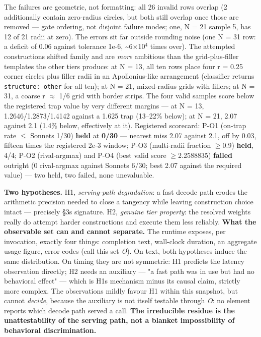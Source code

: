 The failures are geometric, not formatting: all 26 invalid rows overlap (2 additionally contain zero-radius circles, but both still overlap once those are removed --- gate ordering, not disjoint failure modes; one, N = 21 sample 5, has 12 of 21 radii at zero). The errors sit far outside rounding noise (one N = 31 row: a deficit of 0.06 against tolerance 1e-6, \textasciitilde6\(\times\)10\(^{4}\) times over). The attempted constructions shifted family and are \emph{more} ambitious than the grid-plus-filler templates the other tiers produce: at N = 13, all ten rows place four r = 0.25 corner circles plus filler radii in an Apollonius-like arrangement (classifier returns \texttt{structure:\ other} for all ten); at N = 21, mixed-radius grids with fillers; at N = 31, a coarse r \(\approx\) 1/6 grid with border strips. The four valid samples score below the registered trap value by very different margins --- at N = 13, 1.2646/1.2873/1.4142 against a 1.625 trap (13--22\% below); at N = 21, 2.07 against 2.1 (1.4\% below, effectively at it). Registered scorecard: P-O1 (on-trap rate \(\leq\) Sonnet\textquotesingle s 1/30) \textbf{held} at \textbf{0/30} --- nearest miss 2.07 against 2.1, off by 0.03, fifteen times the registered 2e-3 window; P-O3 (multi-radii fraction \(\geq\)0.9) \textbf{held}, 4/4; P-O2 (rival-argmax) and P-O4 (best valid score \(\geq\)2.2588835) \textbf{failed} outright (0 rival-argmax against Sonnet\textquotesingle s 6/30; best 2.07 against the required value) --- two held, two failed, none unevaluable.

\textbf{Two hypotheses.} H1, \emph{serving-path degradation}: a fast decode path erodes the arithmetic precision needed to close a tangency while leaving construction choice intact --- precisely §3\textquotesingle s signature. H2, \emph{genuine tier property}: the resolved weights really do attempt harder constructions and execute them less reliably. \textbf{What the observable set can and cannot separate.} The runtime exposes, per invocation, exactly four things: completion text, wall-clock duration, an aggregate usage figure, error codes (call this set \emph{O}). On text, both hypotheses induce the same distribution. On timing they are not symmetric: H1 predicts the latency observation directly; H2 needs an auxiliary --- "a fast path was in use but had no behavioral effect" --- which is H1\textquotesingle s mechanism minus its causal claim, strictly more complex. The observations mildly favour H1 within this snapshot, but cannot \emph{decide}, because the auxiliary is not itself testable through \emph{O}: no element reports which decode path served a call. \textbf{The irreducible residue is the unattestability of the serving path, not a blanket impossibility of behavioral discrimination.}

